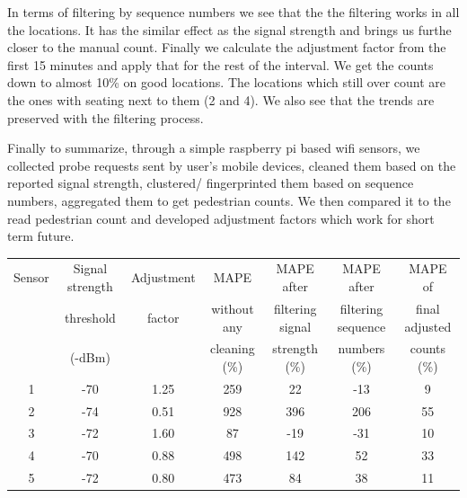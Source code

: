 In terms of filtering by sequence numbers we see that the the filtering works in all the locations. It has the similar effect as the signal strength and brings us furthe closer to the manual count. Finally we calculate the adjustment factor from the first 15 minutes and apply that for the rest of the interval. We get the counts down to almost 10\% on good locations. The locations which still over count are the ones with seating next to them (2 and 4). We also see that the trends are preserved with the filtering process.

Finally to summarize, through a simple raspberry pi based wifi sensors, we collected probe requests sent by user's mobile devices, cleaned them based on the reported signal strength, clustered/ fingerprinted them based on sequence numbers, aggregated them to get pedestrian counts. We then compared it to the read pedestrian count and developed adjustment factors which work for short term future.

\begin{table}
	{\begin{tabular}{ccccccc} 
		\toprule
			Sensor & Signal strength & Adjustment & MAPE & MAPE after & MAPE after & MAPE of\\
			& threshold & factor & without any & filtering signal & filtering sequence & final adjusted\\
			& (-dBm) & &  cleaning (\%) & strength (\%) & numbers (\%) & counts (\%)\\
		 \midrule
			1 & -70 & 1.25 & 259 &  22 & -13 &  9 \\
			2 & -74 & 0.51 & 928 & 396 & 206 & 55 \\
			3 & -72 & 1.60 &  87 & -19 & -31 & 10 \\
			4 & -70 & 0.88 & 498 & 142 &  52 & 33 \\
			5 & -72 & 0.80 & 473 &  84 &  38 & 11 \\
		 \bottomrule
	\end{tabular}}
	\label{errors-table}
\end{table}

